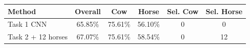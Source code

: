 \begin{tabular}{p{2.1cm}ccccc}
\toprule
Method & Overall & Cow & Horse & Sel. Cow & Sel. Horse \\
\midrule
Task 1 CNN & 65.85\% & 75.61\% & 56.10\% & 0 & 0 \\
Task 2 + 12 horses & 67.07\% & 75.61\% & 58.54\% & 0 & 12 \\
\bottomrule
\end{tabular}
